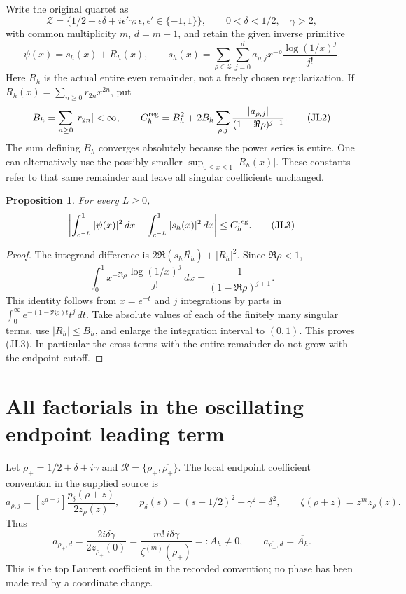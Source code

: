 \documentclass[11pt,a4paper]{article}
\newtheorem{proposition}[theorem]{Proposition}
\begin{document}
Write the original quartet as
\[
\mathcal Z=\{1/2+\epsilon\delta+i\epsilon'\gamma:
                 \epsilon,\epsilon'\in\{-1,1\}\},
\qquad 0<\delta<1/2,\quad\gamma>2,
\]
with common multiplicity \(m\), \(d=m-1\), and retain the given inverse
primitive
\[
\psi(x)=s_h(x)+R_h(x),\qquad
s_h(x)=\sum_{\rho\in\mathcal Z}\sum_{j=0}^{d}
a_{\rho,j}x^{-\rho}\frac{\log(1/x)^j}{j!}.
\tag{JL1}
\]
Here \(R_h\) is the actual entire even remainder, not a freely chosen
regularization.  If
\(R_h(x)=\sum_{n\ge0}r_{2n}x^{2n}\), put
\[
B_h=\sum_{n\ge0}|r_{2n}|<\infty,\qquad
C_h^{\rm reg}=B_h^2+
2B_h\sum_{\rho,j}
\frac{|a_{\rho,j}|}{(1-\Re\rho)^{j+1}}.
\tag{JL2}
\]
The sum defining \(B_h\) converges absolutely because the power series
is entire.  One can alternatively use the possibly smaller
\(\sup_{0\le x\le1}|R_h(x)|\).  These constants refer to that same remainder
and leave all singular coefficients unchanged.

\begin{proposition}
For every \(L\ge0\),
\[
\left|\int_{e^{-L}}^1|\psi(x)|^2\,dx
      -\int_{e^{-L}}^1|s_h(x)|^2\,dx\right|
\le C_h^{\rm reg}.
\tag{JL3}
\]
\end{proposition}
\begin{proof}
The integrand difference is
\(2\Re(s_h\overline{R_h})+|R_h|^2\).  Since
\(\Re\rho<1\),
\[
\int_0^1 x^{-\Re\rho}\frac{\log(1/x)^j}{j!}\,dx
=\frac1{(1-\Re\rho)^{j+1}}.
\]
This identity follows from \(x=e^{-t}\) and \(j\) integrations by parts
in \(\int_0^\infty e^{-(1-\Re\rho)t}t^j\,dt\).
Take absolute values of each of the finitely many singular terms,
use \(|R_h|\le B_h\), and enlarge the integration interval to \((0,1)\).
This proves (JL3).  In particular the cross terms with the entire
remainder do not grow with the endpoint cutoff.
\end{proof}

\section{All factorials in the oscillating endpoint leading term}

Let
\(\rho_+=1/2+\delta+i\gamma\) and
\(\mathcal R=\{\rho_+,\overline{\rho_+}\}\).
The local endpoint coefficient convention in the supplied source is
\[
a_{\rho,j}=[z^{d-j}]
\frac{p_\delta(\rho+z)}{2z_\rho(z)},\qquad
p_\delta(s)=(s-1/2)^2+\gamma^2-\delta^2,\qquad
\zeta(\rho+z)=z^m z_\rho(z).
\tag{JL4}
\]
Thus
\[
a_{\rho_+,d}
=\frac{2i\delta\gamma}{2z_{\rho_+}(0)}
=\frac{m!\,i\delta\gamma}{\zeta^{(m)}(\rho_+)}
=:A_h\ne0,\qquad
a_{\overline{\rho_+},d}=\overline{A_h}.
\tag{JL5}
\]
This is the top Laurent coefficient in the recorded convention; no
phase has been made real by a coordinate change.
\end{document}
